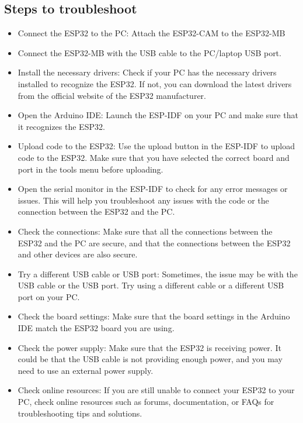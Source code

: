 \subsection{Steps to troubleshoot}
\begin{itemize}
	\item Connect the ESP32 to the PC: Attach the ESP32-CAM to the ESP32-MB
	\item Connect the ESP32-MB with the USB cable to the PC/laptop USB port.
	\item Install the necessary drivers: Check if your PC has the necessary drivers installed to recognize the ESP32. If not, you can download the latest drivers from the official website of the ESP32 manufacturer.
	\item Open the Arduino IDE: Launch the ESP-IDF on your PC and make sure that it recognizes the ESP32.
	\item Upload code to the ESP32: Use the upload button in the ESP-IDF to upload code to the ESP32. Make sure that you have selected the correct board and port in the tools menu before uploading.
	\item Open the serial monitor in the ESP-IDF to check for any error messages or issues. This will help you troubleshoot any issues with the code or the connection between the ESP32 and the PC.
	\item Check the connections: Make sure that all the connections between the ESP32 and the PC are secure, and that the connections between the ESP32 and other devices are also secure.
	\item Try a different USB cable or USB port: Sometimes, the issue may be with the USB cable or the USB port. Try using a different cable or a different USB port on your PC.
	\item Check the board settings: Make sure that the board settings in the Arduino IDE match the ESP32 board you are using.
	\item Check the power supply: Make sure that the ESP32 is receiving power. It could be that the USB cable is not providing enough power, and you may need to use an external power supply.
	\item Check online resources: If you are still unable to connect your ESP32 to your PC, check online resources such as forums, documentation, or FAQs for troubleshooting tips and solutions.
\end{itemize}

